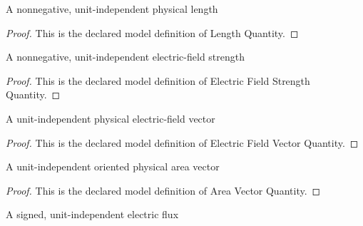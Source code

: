 \begin{definition}
  \label{def:physics:phyx-mini-0851:phyxminiproblems-problemphyxmini0851-lengthquantity}
  A nonnegative, unit-independent physical length
\end{definition}
\begin{proof}
  This is the declared model definition of Length Quantity.
\end{proof}
\begin{definition}
  \label{def:physics:phyx-mini-0851:phyxminiproblems-problemphyxmini0851-electricfieldstrengthquantity}
  A nonnegative, unit-independent electric-field strength
\end{definition}
\begin{proof}
  This is the declared model definition of Electric Field Strength Quantity.
\end{proof}
\begin{definition}
  \label{def:physics:phyx-mini-0851:phyxminiproblems-problemphyxmini0851-electricfieldvectorquantity}
  A unit-independent physical electric-field vector
\end{definition}
\begin{proof}
  This is the declared model definition of Electric Field Vector Quantity.
\end{proof}
\begin{definition}
  \label{def:physics:phyx-mini-0851:phyxminiproblems-problemphyxmini0851-areavectorquantity}
  A unit-independent oriented physical area vector
\end{definition}
\begin{proof}
  This is the declared model definition of Area Vector Quantity.
\end{proof}
\begin{definition}
  \label{def:physics:phyx-mini-0851:phyxminiproblems-problemphyxmini0851-signedelectricfluxquantity}
  A signed, unit-independent electric flux
\end{definition}
